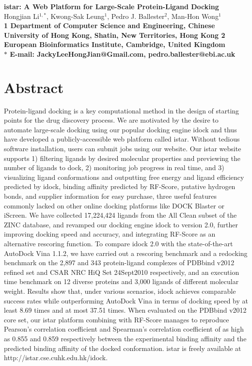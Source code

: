 \documentclass[10pt]{article}
\date{}
\begin{document}
\begin{flushleft}
{\Large
\textbf{istar: A Web Platform for Large-Scale Protein-Ligand Docking}
}
\\
Hongjian Li$^{1,\ast}$, 
Kwong-Sak Leung$^{1}$, 
Pedro J. Ballester$^{2}$,
Man-Hon Wong$^{1}$
\\
\bf{1} Department of Computer Science and Engineering, Chinese University of Hong Kong, Shatin, New Territories, Hong Kong
\bf{2} European Bioinformatics Institute, Cambridge, United Kingdom
\\
$\ast$ E-mail: JackyLeeHongJian@Gmail.com, pedro.ballester@ebi.ac.uk
\end{flushleft}

\section*{Abstract}
Protein-ligand docking is a key computational method in the design of starting points for the drug discovery process. We are motivated by the desire to automate large-scale docking using our popular docking engine idock and thus have developed a publicly-accessible web platform called istar. Without tedious software installation, users can submit jobs using our website. Our istar website supports 1) filtering ligands by desired molecular properties and previewing the number of ligands to dock, 2) monitoring job progress in real time, and 3) visualizing ligand conformations and outputting free energy and ligand efficiency predicted by idock, binding affinity predicted by RF-Score, putative hydrogen bonds, and supplier information for easy purchase, three useful features commonly lacked on other online docking platforms like DOCK Blaster or iScreen. We have collected 17,224,424 ligands from the All Clean subset of the ZINC database, and revamped our docking engine idock to version 2.0, further improving docking speed and accuracy, and integrating RF-Score as an alternative rescoring function. To compare idock 2.0 with the state-of-the-art AutoDock Vina 1.1.2, we have carried out a rescoring benchmark and a redocking benchmark on the 2,897 and 343 protein-ligand complexes of PDBbind v2012 refined set and CSAR NRC HiQ Set 24Sept2010 respectively, and an execution time benchmark on 12 diverse proteins and 3,000 ligands of different molecular weight. Results show that, under various scenarios, idock achieves comparable success rates while outperforming AutoDock Vina in terms of docking speed by at least 8.69 times and at most 37.51 times. When evaluated on the PDBbind v2012 core set, our istar platform combining with RF-Score manages to reproduce Pearson's correlation coefficient and Spearman's correlation coefficient of as high as 0.855 and 0.859 respectively between the experimental binding affinity and the predicted binding affinity of the docked conformation. istar is freely available at http://istar.cse.cuhk.edu.hk/idock.
\end{document}
